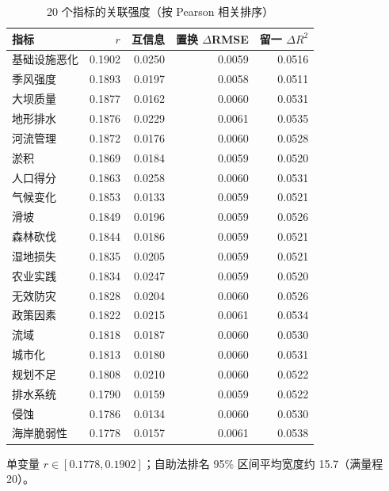 \begin{table}[htbp]
\centering
\caption{20 个指标的关联强度（按 Pearson 相关排序）}
\label{tab:importance}
\small
\begin{tabular}{lrrrr}
\toprule
指标 & $r$ & 互信息 & 置换 $\Delta$RMSE & 留一 $\Delta R^2$ \\
\midrule
基础设施恶化 & 0.1902 & 0.0250 & 0.0059 & 0.0516 \\
季风强度 & 0.1893 & 0.0197 & 0.0058 & 0.0511 \\
大坝质量 & 0.1877 & 0.0162 & 0.0060 & 0.0531 \\
地形排水 & 0.1876 & 0.0229 & 0.0061 & 0.0535 \\
河流管理 & 0.1872 & 0.0176 & 0.0060 & 0.0528 \\
淤积 & 0.1869 & 0.0184 & 0.0059 & 0.0520 \\
人口得分 & 0.1863 & 0.0258 & 0.0060 & 0.0531 \\
气候变化 & 0.1853 & 0.0133 & 0.0059 & 0.0521 \\
滑坡 & 0.1849 & 0.0196 & 0.0059 & 0.0526 \\
森林砍伐 & 0.1844 & 0.0186 & 0.0059 & 0.0521 \\
湿地损失 & 0.1835 & 0.0205 & 0.0059 & 0.0521 \\
农业实践 & 0.1834 & 0.0247 & 0.0059 & 0.0520 \\
无效防灾 & 0.1828 & 0.0204 & 0.0060 & 0.0526 \\
政策因素 & 0.1822 & 0.0215 & 0.0061 & 0.0534 \\
流域 & 0.1818 & 0.0187 & 0.0060 & 0.0530 \\
城市化 & 0.1813 & 0.0180 & 0.0060 & 0.0531 \\
规划不足 & 0.1808 & 0.0210 & 0.0060 & 0.0522 \\
排水系统 & 0.1790 & 0.0159 & 0.0059 & 0.0522 \\
侵蚀 & 0.1786 & 0.0134 & 0.0060 & 0.0530 \\
海岸脆弱性 & 0.1778 & 0.0157 & 0.0061 & 0.0538 \\
\bottomrule
\end{tabular}
\par\vspace{2pt}\footnotesize 单变量 $r\in[0.1778,0.1902]$；自助法排名 95\% 区间平均宽度约 15.7（满量程 20）。
\end{table}
